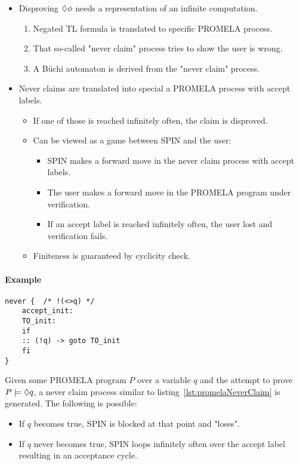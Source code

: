 				\begin{itemize}
					\item Disproving \( \lozenge \phi \) needs a representation of an infinite computation.
						\begin{enumerate}
							\item Negated TL formula is translated to specific PROMELA process.
							\item That so-called "never claim" process tries to show the user is wrong.
							\item A Büchi automaton is derived from the "never claim" process.
						\end{enumerate}
					\item Never claims are translated into special a PROMELA process with accept labels.
						\begin{itemize}
							\item If one of those is reached infinitely often, the claim is disproved.
							\item Can be viewed as a game between SPIN and the user:
								\begin{itemize}
									\item SPIN makes a forward move in the never claim process with accept labels.
									\item The user makes a forward move in the PROMELA program under verification.
									\item If an accept label is reached infinitely often, the user lost and verification fails.
								\end{itemize}
							\item Finiteness is guaranteed by cyclicity check.
						\end{itemize}
				\end{itemize}

				\paragraph{Example}
					\begin{lstlisting}[caption = { Never Claim PROMELA Process }, label = lst:promelaNeverClaim, language = PROMELA]
never {  /* !(<>q) */
	accept_init:
	TO_init:
	if
	:: (!q) -> goto TO_init
	fi
}
					\end{lstlisting}

					Given some PROMELA program \(P\) over a variable \(q\) and the attempt to prove \( P \models \lozenge q \), a never claim process similar to listing~\ref{lst:promelaNeverClaim} is generated. The following is possible:
					\begin{itemize}
						\item If \(q\) becomes true, SPIN is blocked at that point and "loses".
						\item If \(q\) never becomes true, SPIN loops infinitely often over the accept label resulting in an acceptance cycle.
					\end{itemize}

